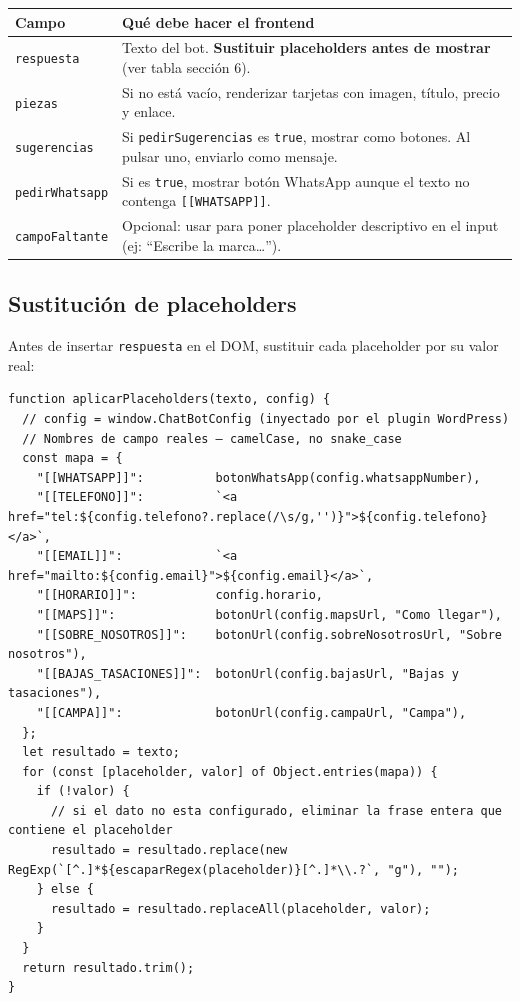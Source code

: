 \documentclass[12pt, a4paper]{article}
\begin{document}
\begin{center}
\renewcommand{\arraystretch}{1.3}
\begin{tabularx}{\textwidth}{lX}
\toprule
\textbf{Campo} & \textbf{Qué debe hacer el frontend} \\
\midrule
\texttt{respuesta}        & Texto del bot. \textbf{Sustituir placeholders antes de mostrar} (ver tabla sección 6). \\
\texttt{piezas}           & Si no está vacío, renderizar tarjetas con imagen, título, precio y enlace. \\
\texttt{sugerencias}      & Si \texttt{pedirSugerencias} es \texttt{true}, mostrar como botones. Al pulsar uno, enviarlo como mensaje. \\
\texttt{pedirWhatsapp}    & Si es \texttt{true}, mostrar botón WhatsApp aunque el texto no contenga \texttt{[[WHATSAPP]]}. \\
\texttt{campoFaltante}    & Opcional: usar para poner placeholder descriptivo en el input (ej: ``Escribe la marca\ldots''). \\
\bottomrule
\end{tabularx}
\end{center}

\subsection{Sustitución de placeholders}

Antes de insertar \texttt{respuesta} en el DOM, sustituir cada placeholder por su valor real:

\begin{lstlisting}[style=js, caption={Función de sustitución de placeholders}]
function aplicarPlaceholders(texto, config) {
  // config = window.ChatBotConfig (inyectado por el plugin WordPress)
  // Nombres de campo reales — camelCase, no snake_case
  const mapa = {
    "[[WHATSAPP]]":          botonWhatsApp(config.whatsappNumber),
    "[[TELEFONO]]":          `<a href="tel:${config.telefono?.replace(/\s/g,'')}">${config.telefono}</a>`,
    "[[EMAIL]]":             `<a href="mailto:${config.email}">${config.email}</a>`,
    "[[HORARIO]]":           config.horario,
    "[[MAPS]]":              botonUrl(config.mapsUrl, "Como llegar"),
    "[[SOBRE_NOSOTROS]]":    botonUrl(config.sobreNosotrosUrl, "Sobre nosotros"),
    "[[BAJAS_TASACIONES]]":  botonUrl(config.bajasUrl, "Bajas y tasaciones"),
    "[[CAMPA]]":             botonUrl(config.campaUrl, "Campa"),
  };
  let resultado = texto;
  for (const [placeholder, valor] of Object.entries(mapa)) {
    if (!valor) {
      // si el dato no esta configurado, eliminar la frase entera que contiene el placeholder
      resultado = resultado.replace(new RegExp(`[^.]*${escaparRegex(placeholder)}[^.]*\\.?`, "g"), "");
    } else {
      resultado = resultado.replaceAll(placeholder, valor);
    }
  }
  return resultado.trim();
}
\end{lstlisting}
\end{document}
